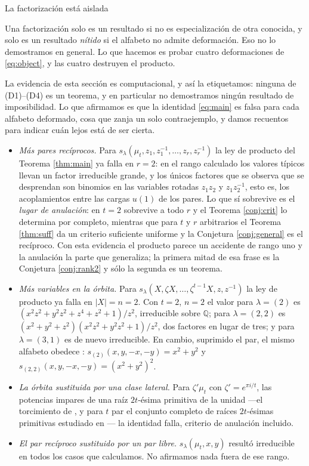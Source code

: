 \documentclass[11pt,reqno]{amsart}
\makeatletter
\renewcommand\section{\@startsection{section}{1}%
  \z@{\linespacing\@plus\linespacing}{.5\linespacing}%
  {\normalfont\large\bfseries\centering}}
\theoremstyle{plain}
\theoremstyle{definition}
\newcommand{\zt}{\mu_t}
\makeatother
\begin{document}
\section{La factorización está aislada}\label{sec:sharp}

Una factorización solo es un resultado si no es especialización de otra conocida, y solo es un
resultado \emph{nítido} si el alfabeto no admite deformación. Eso no lo demostramos en general. Lo
que hacemos es probar cuatro deformaciones de \eqref{eq:object}, y las cuatro destruyen el producto.

La evidencia de esta sección es computacional, y así la etiquetamos: ninguna de (D1)--(D4) es un
teorema, y en particular no demostramos ningún resultado de imposibilidad. Lo que afirmamos es que la
identidad \eqref{eq:main} es falsa para cada alfabeto deformado, cosa que zanja un solo
contraejemplo, y damos recuentos para indicar cuán lejos está de ser cierta.

\begin{itemize}
\item[\rm(D1)] \emph{Más pares recíprocos.} Para
$s_\lambda(\zt,z_1,z_1^{-1},\dots,z_r,z_r^{-1})$
la ley de producto del Teorema \ref{thm:main} ya falla en $r=2$: en el rango calculado los valores
típicos llevan un factor irreducible grande, y los únicos
factores que se observa que se desprendan son binomios en las variables rotadas $z_1z_2$ y $z_1z_2^{-1}$, esto es,
los acoplamientos entre las cargas $u(1)$ de los pares. Lo que sí sobrevive es el \emph{lugar de
anulación}: en $t=2$ sobrevive a todo $r$ y el Teorema \ref{conj:crit} lo determina por completo,
mientras que para $t$ y $r$ arbitrarios el Teorema \ref{thm:suff} da un criterio suficiente uniforme
y la Conjetura \ref{conj:general} es el recíproco. Con esta evidencia el producto parece un accidente
de rango uno y la anulación la parte que generaliza; la primera mitad de esa frase es la Conjetura
\ref{conj:rank2} y sólo la segunda es un teorema.
\item[\rm(D2)] \emph{Más variables en la órbita.} Para
$s_\lambda(X,\zeta X,\dots,\zeta^{t-1}X,z,z^{-1})$ la ley de producto ya falla en $|X|=n=2$. Con $t=2$,
$n=2$ el valor para $\lambda=(2)$ es $(x^2z^2+y^2z^2+z^4+z^2+1)/z^2$, irreducible sobre $\mathbb Q$;
para $\lambda=(2,2)$ es $(x^2+y^2+z^2)(x^2z^2+y^2z^2+1)/z^2$, dos factores en lugar de tres; y para
$\lambda=(3,1)$ es de nuevo irreducible. En cambio, suprimido el par, el mismo alfabeto obedece
\cite[Teorema 2.3]{AK25}: $s_{(2)}(x,y,-x,-y)=x^2+y^2$ y $s_{(2,2)}(x,y,-x,-y)=(x^2+y^2)^2$.
\item[\rm(D3)] \emph{La órbita sustituida por una clase lateral.} Para $\zeta'\zt$ con
$\zeta'=e^{\pi i/t}$, las potencias impares de una raíz $2t$-ésima primitiva de la unidad ---el
torcimiento de \cite[\S3]{AK25}, y para $t$ par el conjunto completo de raíces $2t$-ésimas primitivas
estudiado en \cite{HI24}--- la identidad falla, criterio de anulación incluido.
\item[\rm(D4)] \emph{El par recíproco sustituido por un par libre.} $s_\lambda(\zt,x,y)$ resultó
irreducible en todos los casos que calculamos. No afirmamos nada fuera de ese rango.
\end{itemize}
\end{document}

